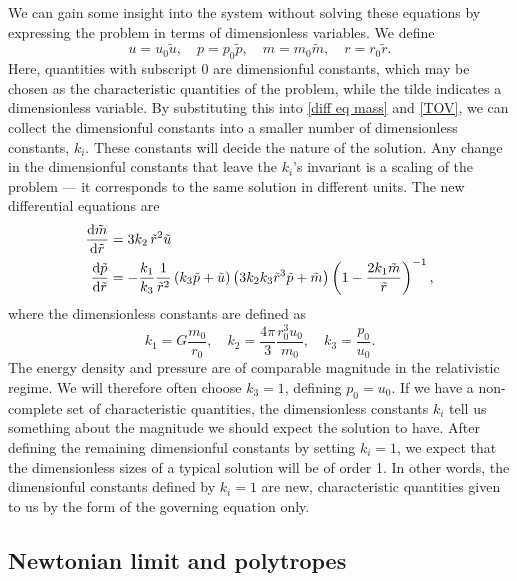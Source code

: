 We can gain some insight into the system without solving these equations by expressing the problem in terms of dimensionless variables.
We define
%
\begin{equation}
    u = u_0 \tilde u, \quad 
    p = p_0 \tilde p, \quad 
    m = m_0 \tilde m, \quad 
    r = r_0 \tilde r.
\end{equation}
%
Here, quantities with subscript $0$ are dimensionful constants, which may be chosen as the characteristic quantities of the problem, while the tilde indicates a dimensionless variable.
By substituting this into \autoref{diff eq mass} and \autoref{TOV}, we can collect the dimensionful constants into a smaller number of dimensionless constants, $k_i$.
These constants will decide the nature of the solution.
Any change in the dimensionful constants that leave the $k_i$'s invariant is a scaling of the problem --- it corresponds to the same solution in different units.
The new differential equations are
%
\begin{align}
    \label{mass relation dimensionless}
    \odv{ \tilde m}{\tilde r} & = 3 k_2\, \tilde r^2 \tilde u \\
    \label{TOV dimensionless}
    \odv{\tilde p}{\tilde r} & 
    = - \frac{k_1}{k_3} \frac{1}{\tilde r^2} \left(k_3\tilde p + \tilde u\right) 
    \left(3 k_2 k_3  \tilde r^3 \tilde p + \tilde m\right) 
    \left(1 - \frac{2 k_1  \tilde m}{\tilde r}\right)^{-1},
\end{align}
%
where the dimensionless constants are defined as
%
\begin{equation}
    \label{dimensionless constants TOV}
    k_1 = G \frac{m_0}{r_0}, \quad 
    k_2 =  \frac{4 \pi}{3} \frac{r_0^3 u_0}{m_0}, \quad
    k_3 = \frac{p_0}{u_0}.
\end{equation}
%
The energy density and pressure are of comparable magnitude in the relativistic regime.
We will therefore often choose $k_3 = 1$, defining $p_0 = u_0$.
If we have a non-complete set of characteristic quantities, the dimensionless constants $k_i$ tell us something about the magnitude we should expect the solution to have.
After defining the remaining dimensionful constants by setting $k_i = 1$, we expect that the dimensionless sizes of a typical solution will be of order 1.
In other words, the dimensionful constants defined by $k_i = 1$ are new, characteristic quantities given to us by the form of the governing equation only.




\subsection{Newtonian limit and polytropes}
\label{subsection: Newtonian limit and polytropes}

